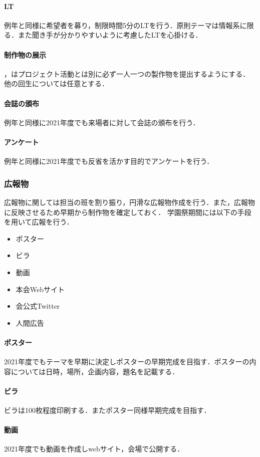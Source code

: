 \paragraph{LT}
例年と同様に希望者を募り，制限時間5分のLTを行う．原則テーマは情報系に限る．また聞き手が分かりやすいように考慮したLTを心掛ける．
\paragraph{制作物の展示}
\secondGrade{}，\thirdGrade{}はプロジェクト活動とは別に必ず一人一つの製作物を提出するようにする．他の回生については任意とする．
\paragraph{会誌の頒布}
例年と同様に2021年度でも来場者に対して会誌の頒布を行う．
\paragraph{アンケート}
例年と同様に2021年度でも反省を活かす目的でアンケートを行う．
\subsubsection{広報物}
広報物に関しては担当の班を割り振り，円滑な広報物作成を行う．また，広報物に反映させるため早期から制作物を確定しておく．
学園祭期間には以下の手段を用いて広報を行う．
\begin{itemize}
    \item ポスター
    \item ビラ
    \item 動画
    \item 本会Webサイト
    \item 会公式Twitter
    \item 人間広告
\end{itemize}
\paragraph{ポスター}
2021年度でもテーマを早期に決定しポスターの早期完成を目指す．ポスターの内容については日時，場所，企画内容，題名を記載する．
\paragraph{ビラ}
ビラは100枚程度印刷する．またポスター同様早期完成を目指す．
\paragraph{動画}
2021年度でも動画を作成しwebサイト，会場で公開する．

